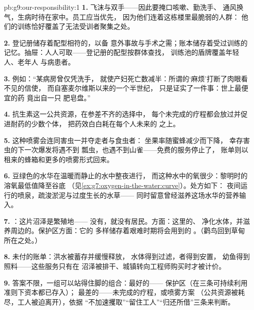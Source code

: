 \begin{solution}{pb:g9:our-responsibility:1}
\textbf{1.} 飞沫与双手——因此要掩口咳嗽、勤洗手、
通风换气，生病时待在家中。员工应当优先，
因为他们连着这栋楼里最脆弱的人群：
他们的训练恰好覆盖了无法受训者聚集之处。

\textbf{2.} 登记册储存着配型相符的，以备
意外事故与手术之需；账本储存着受过训练的
记忆。抽屉：人人可取——登记册的配型按群体查找，
训练池的盾牌覆盖年轻人、老年人
与病患者。

\textbf{3.} 例如：“某病房曾仅凭洗手，
就使产妇死亡数减半：所谓的‘麻烦’打断了肉眼看不见的信使，
而自塞麦尔维斯以来的一个半世纪，
只是证实了一件事：世上最便宜的药
竟出自一只
肥皂盘。”

\textbf{4.} 抗生素这一公共资源，在参差不齐的选择中，
每个未完成的疗程都会放过并促进耐药的少数个体，
把药效白白耗在每个人未来的
之上。

\textbf{5.} 这种喷雾会连同害虫一并夺走者与食虫者：
坐果率随蜜蜂减少而下降，
幸存害虫的下一次爆发将遇不到
瓢虫，也遇不到山雀——免费的服务停止了，
账单则以租来的蜂箱和更多的喷雾形式回来。

\textbf{6.} 豆绿色的水华在温暖而静止的水中整夜进行，
而这种水中的氧很少：黎明时的
溶氧最低值降至谷底
（见\cref{ex:g7:oxygen-in-the-water:curve}）。处方如下：
夜间运行的喷泉，疏浚淤泥与过度生长的水草——
同时留意曾经滋养这场水华的营养输入。

\textbf{7.} ：这片沼泽是繁殖地——
没有，就没有居民。方面：这里的、
净化水体，并滋养周边的。保护区方面：它的
多样储存着艰难时期将会用到的
。（鹳鸟回到草甸所在之处。）

\textbf{8.} 未付的账单：洪水被蓄存并缓慢释放，
水体得到过滤，者得到安置，
幼鱼得到照料——这些服务只有在
沼泽被排干、城镇转向工程师购买时才被计价。

\textbf{9.} 答案不限，一组可以站得住脚的组合：最好的——
保护区（在三条可持续利用准则下资本都已存入）；
最差的——未完成的疗程，或喷雾方案
（公共资源被耗尽，工人被迫离开），依据
“不加速攫取”“留住工人”“归还所借”三条来判断。


\end{solution}
